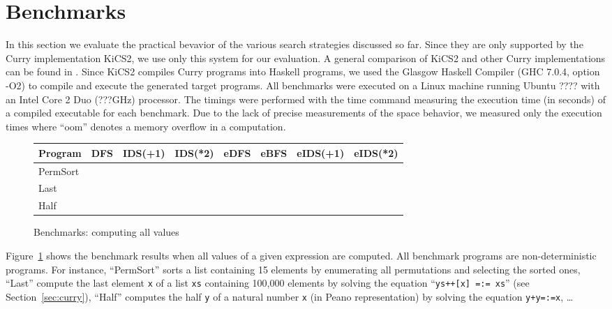 \documentclass[english]{lni}
\newcommand{\code}[1]{\texttt{\small{}#1}}
\newcommand{\ccode}[1]{``\code{#1}''}
\begin{document}
\section{Benchmarks}
\label{sec:benchmarks}

In this section we evaluate the practical bevavior
of the various search strategies discussed so far.
Since they are only supported by the Curry implementation KiCS2,
we use only this system for our evaluation.
A general comparison of KiCS2 and other Curry implementations
can be found in \cite{BrasselHanusPeemoellerReck11}.
Since KiCS2 compiles Curry programs into Haskell programs,
we used the Glasgow Haskell Compiler
(GHC 7.0.4, option -O2) to compile and execute
the generated target programs.
All benchmarks were executed on a Linux machine
running Ubuntu ???? with an Intel Core 2 Duo (???GHz) processor.
The timings were performed with the time command measuring the
execution time (in seconds) of a compiled executable for each benchmark.
Due to the lack of precise measurements of the space behavior,
we measured only the execution times where
``oom'' denotes a memory overflow in a computation.

\begin{figure}[ht]
\centering
\begin{tabular}{|@{~~}l@{~~}|*{7}{@{~~}r@{~~}|}}
\hline
Program &   DFS  & IDS(+1) & IDS(*2) & eDFS & eBFS & eIDS(+1) & eIDS(*2) \\\hline
PermSort  &     \\
Last      &     \\
Half      &     \\
\hline
\end{tabular}
\caption{Benchmarks: computing all values}
\label{fig:bench-all-solutions}
\end{figure}

Figure~\ref{fig:bench-all-solutions} shows the benchmark results
when all values of a given expression are computed.
All benchmark programs are non-deterministic programs.
For instance, ``PermSort'' sorts
a list containing 15 elements by enumerating all permutations
and selecting the sorted ones,
``Last'' compute the last element \code{x}
of a list \code{xs} containing 100,000 elements
by solving the equation \ccode{ys++[x] =:= xs}
(see Section~\ref{sec:curry}),
``Half'' computes the half \code{y} of a natural number \code{x}
(in Peano representation) by solving the equation \code{y+y=:=x},
\ldots
\end{document}
